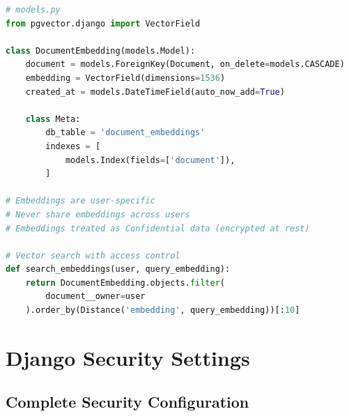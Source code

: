 \documentclass{report}
\begin{document}
\begin{lstlisting}[language=Python]
# models.py
from pgvector.django import VectorField

class DocumentEmbedding(models.Model):
    document = models.ForeignKey(Document, on_delete=models.CASCADE)
    embedding = VectorField(dimensions=1536)
    created_at = models.DateTimeField(auto_now_add=True)
    
    class Meta:
        db_table = 'document_embeddings'
        indexes = [
            models.Index(fields=['document']),
        ]

# Embeddings are user-specific
# Never share embeddings across users
# Embeddings treated as Confidential data (encrypted at rest)

# Vector search with access control
def search_embeddings(user, query_embedding):
    return DocumentEmbedding.objects.filter(
        document__owner=user
    ).order_by(Distance('embedding', query_embedding))[:10]
\end{lstlisting}

\chapter{Django Security Settings}

\section{Complete Security Configuration}
\end{document}
